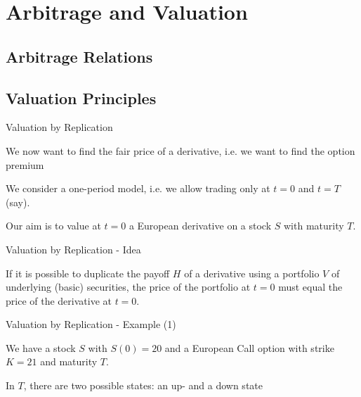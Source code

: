 \section{Arbitrage and Valuation}

{}
\vspace{0cm}
\begin{center}
\end{center}

\subsection{Arbitrage Relations}
\subsection{Valuation Principles}

{Valuation by Replication}


	We now want to find the fair price of a derivative, i.e. we want to find the option premium
\vspace{0.3cm}

	We consider a one-period model, i.e. we allow trading only at
$t=0$ and $t=T$(say).

	Our aim is to value at $t=0$  a European
derivative on a stock $S$ with maturity $T$.


{Valuation by Replication - Idea}


	If it is possible to duplicate the payoff $H$ of a derivative
using a portfolio $V$ of underlying (basic) securities, the price of the
portfolio at $t=0$ must equal the price of the derivative at
$t=0$.


{Valuation by Replication - Example (1)}


	We have a stock $S$ with $S(0)=20$ and a European Call option with strike $K=21$ and maturity $T$.

	In $T$, there are two possible states: an up- and a down state



